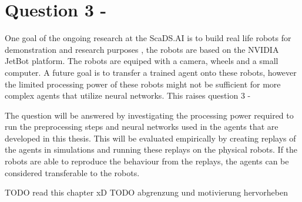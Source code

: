 \section{Question 3 - \questionThree}

One goal of the ongoing research at the ScaDS.AI is to build real life robots for demonstration and research purposes \textcite{merlin_flach}, the robots are based on the NVIDIA JetBot platform. The robots are equiped with a camera, wheels and a small computer. A future goal is to transfer a trained agent onto these robots, however the limited processing power of these robots might not be sufficient for more complex agents that utilize neural networks. This raises question 3 - \questionThree


The question will be answered by investigating the processing power required to run the preprocessing steps and neural networks used in the agents that are developed in this thesis. This will be evaluated empirically by creating replays of the agents in simulations and running these replays on the physical robots. If the robots are able to reproduce the behaviour from the replays, the agents can be considered transferable to the robots.

TODO read this chapter xD
TODO abgrenzung und motivierung hervorheben